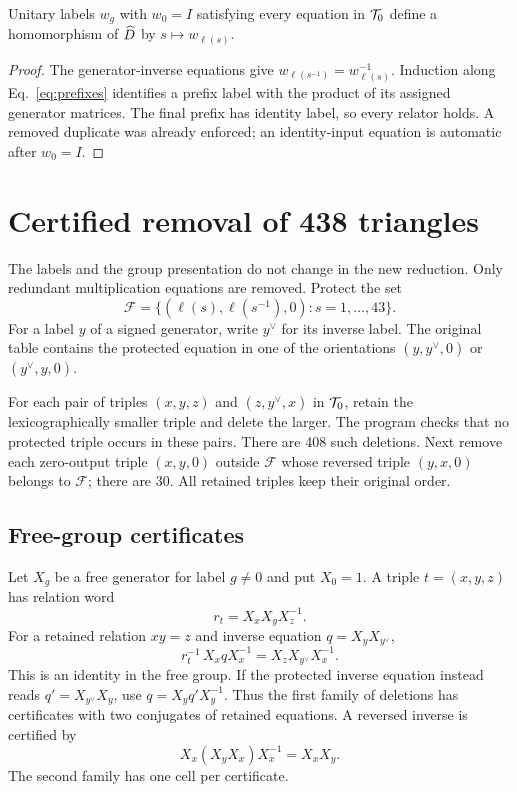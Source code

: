 \begin{lemma}\label{lem:prefix}
Unitary labels $w_g$ with $w_0=I$ satisfying every equation in $\mathcal T_0$ define a
homomorphism of $\widehat D$ by $s\mapsto w_{\ell(s)}$.
\end{lemma}
\begin{proof}
The generator-inverse equations give $w_{\ell(s^{-1})}=w_{\ell(s)}^{-1}$. Induction along
Eq.~\eqref{eq:prefixes} identifies a prefix label with the product of its assigned generator
matrices. The final prefix has identity label, so every relator holds. A removed duplicate
was already enforced; an identity-input equation is automatic after $w_0=I$.
\end{proof}

\section{Certified removal of 438 triangles}\label{sec:pruning}

The labels and the group presentation do not change in the new reduction. Only redundant
multiplication equations are removed. Protect the set
\[
 \mathcal F=\{(\ell(s),\ell(s^{-1}),0):s=1,\ldots,43\}.
\]
For a label $y$ of a signed generator, write $y^\vee$ for its inverse label. The original
table contains the protected equation in one of the orientations $(y,y^\vee,0)$ or
$(y^\vee,y,0)$.

For each pair of triples $(x,y,z)$ and $(z,y^\vee,x)$ in $\mathcal T_0$, retain the
lexicographically smaller triple and delete the larger. The program checks that no protected
triple occurs in these pairs. There are 408 such deletions. Next remove each zero-output
triple $(x,y,0)$ outside $\mathcal F$ whose reversed triple $(y,x,0)$ belongs to
$\mathcal F$; there are 30. All retained triples keep their original order.

\subsection{Free-group certificates}
Let $X_g$ be a free generator for label $g\ne0$ and put $X_0=1$. A triple $t=(x,y,z)$
has relation word
\[
 r_t=X_xX_yX_z^{-1}.
\]
For a retained relation $xy=z$ and inverse equation $q=X_yX_{y^\vee}$,
\begin{equation}
 r_t^{-1}\,X_xqX_x^{-1}=X_zX_{y^\vee}X_x^{-1}.
 \label{eq:delete-cert}
\end{equation}
This is an identity in the free group. If the protected inverse equation instead reads
$q'=X_{y^\vee}X_y$, use $q=X_yq'X_y^{-1}$. Thus the first family of deletions has
certificates with two conjugates of retained equations. A reversed inverse is certified by
\begin{equation}
 X_x(X_yX_x)X_x^{-1}=X_xX_y.
\end{equation}
The second family has one cell per certificate.

